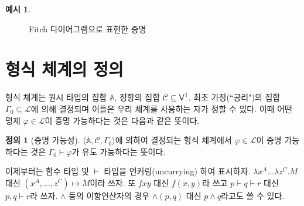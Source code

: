 \documentclass[10pt,twocolumn]{article}
\theoremstyle{definition}
\newtheorem{definition}[theorem]{정의}
\newtheorem{example}[theorem]{예시}
\begin{document}
\begin{example}
	\begin{figure}[hbt] \centering\small{}
		\caption{Fitch 다이어그램으로 표현한 증명} \label{fig:proof2}
	\end{figure}
\end{example}

\section{형식 체계의 정의}

형식 체계는 원시 타입의 집합 $\mathbb A$, 정항의 집합 $\mathcal C\subseteq\mathsf V^{\mathds T}$, 최초 가정(``공리")의 집합 $\Gamma_0\subseteq\mathcal L$에 의해 결정되며 이들은 우리 체계를 사용하는 자가 정할 수 있다. 이때 어떤 명제 $\varphi\in\mathcal L$이 증명 가능하다는 것은 다음과 같은 뜻이다.

\begin{definition}[증명 가능성]
	$\langle\mathbb A,\mathcal C,\Gamma_0\rangle$에 의하여 결정되는 형식 체계에서 $\varphi\in\mathcal L$이 증명 가능하다는 것은 $\Gamma_0\vdash\varphi$가 유도 가능하다는 뜻이다.
\end{definition}

이제부터는 함수 타입 및 $\vdash$ 타입을 언커링(uncurrying) 하여 표시하자. $\lambda x^A\ldots\lambda z^C.M$ 대신 $(x^A, \ldots, z^C)\mapsto M$이라 쓰자. 또 $fxy$ 대신 $f(x, y)$라 쓰고 $p\vdash q\vdash r$ 대신 $p, q\vdash r$라 쓰자. $\land$ 등의 이항연산자의 경우 ${\land}(p, q)$ 대신 $p\land q$라고도 쓸 수 있다.
\end{document}
